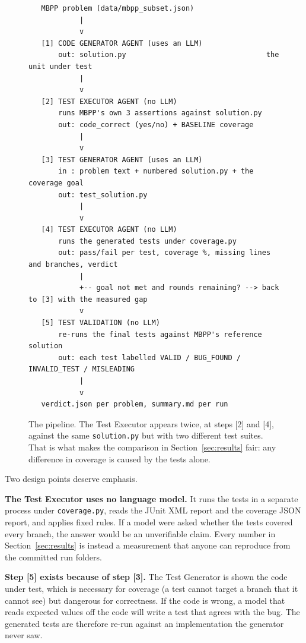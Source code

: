 \documentclass[11pt,a4paper]{article}
\begin{document}
\begin{figure}[htbp]
\centering
\begin{minipage}{0.92\textwidth}
\begin{verbatim}
   MBPP problem (data/mbpp_subset.json)
            |
            v
   [1] CODE GENERATOR AGENT (uses an LLM)
       out: solution.py                                 the unit under test
            |
            v
   [2] TEST EXECUTOR AGENT (no LLM)
       runs MBPP's own 3 assertions against solution.py
       out: code_correct (yes/no) + BASELINE coverage
            |
            v
   [3] TEST GENERATOR AGENT (uses an LLM)
       in : problem text + numbered solution.py + the coverage goal
       out: test_solution.py
            |
            v
   [4] TEST EXECUTOR AGENT (no LLM)
       runs the generated tests under coverage.py
       out: pass/fail per test, coverage %, missing lines and branches, verdict
            |
            +-- goal not met and rounds remaining? --> back to [3] with the measured gap
            v
   [5] TEST VALIDATION (no LLM)
       re-runs the final tests against MBPP's reference solution
       out: each test labelled VALID / BUG_FOUND / INVALID_TEST / MISLEADING
            |
            v
   verdict.json per problem, summary.md per run
\end{verbatim}
\end{minipage}
\caption{The pipeline. The Test Executor appears twice, at steps [2] and [4], against the same
\texttt{solution.py} but with two different test suites. That is what makes the comparison in
Section~\ref{sec:results} fair: any difference in coverage is caused by the tests alone.}
\label{fig:pipeline}
\end{figure}

Two design points deserve emphasis.

\textbf{The Test Executor uses no language model.} It runs the tests in a separate process under
\texttt{coverage.py}, reads the JUnit XML report and the coverage JSON report, and applies fixed rules. If a
model were asked whether the tests covered every branch, the answer would be an unverifiable claim. Every
number in Section~\ref{sec:results} is instead a measurement that anyone can reproduce from the committed run
folders.

\textbf{Step [5] exists because of step [3].} The Test Generator is shown the code under test, which is
necessary for coverage (a test cannot target a branch that it cannot see) but dangerous for correctness. If the
code is wrong, a model that reads expected values off the code will write a test that agrees with the bug. The
generated tests are therefore re-run against an implementation the generator never saw.
\end{document}
